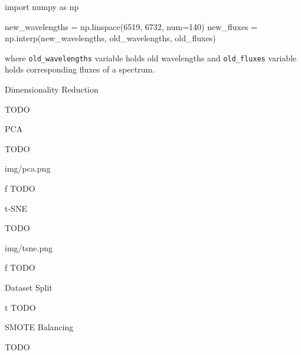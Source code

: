 \begtt
import numpy as np

new_wavelengths = np.linspace(6519, 6732, num=140)
new_fluxes = np.interp(new_wavelengths, old_wavelengths, old_fluxes)
\endtt

where {\tt old\_wavelengths} variable holds old wavelengths
and {\tt old\_fluxes} variable holds corresponding fluxes of a spectrum.

\sec Dimensionality Reduction

TODO

\secc PCA

TODO

\midinsert {}
\picw=15cm \cinspic img/pca.png
\caption/f TODO
\endinsert

\secc t-SNE

TODO

\midinsert {}
\picw=15cm \cinspic img/tsne.png
\caption/f TODO
\endinsert

\sec Dataset Split

\midinsert {}
\caption/t TODO
\endinsert

\sec SMOTE Balancing

TODO

